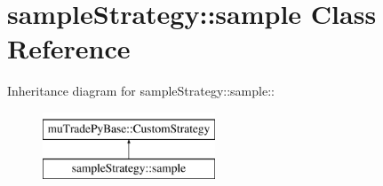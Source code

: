 \hypertarget{classsampleStrategy_1_1sample}{
\section{sampleStrategy::sample Class Reference}
\label{classsampleStrategy_1_1sample}
}
Inheritance diagram for sampleStrategy::sample::\begin{figure}[H]
\begin{center}
\leavevmode
\includegraphics[height=2cm]{classsampleStrategy_1_1sample}
\end{center}
\end{figure}

